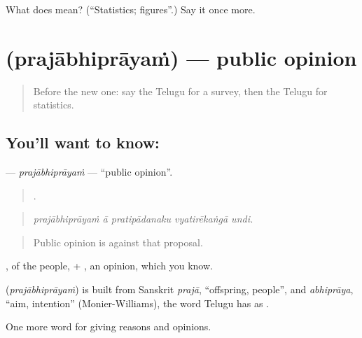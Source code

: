 \begin{tcolorbox}[breakable,colback=teal!4,colframe=teal!35!black,title={Before you move on}]
What does  mean? (\textquotedblleft{}Statistics; figures\textquotedblright{}.) Say it once more.
\end{tcolorbox}
\section[\texorpdfstring{\te{ప్రజాభిప్రాయం} (prajābhiprāyaṁ)}{ప్రజాభిప్రాయం (prajābhiprāyaṁ)}]{ (prajābhiprāyaṁ) — public opinion}

\label{lesson:TE-C411-prajabhiprayam}



\begin{quote}
Before the new one: say the Telugu for a survey, then the Telugu for statistics.
\end{quote}

\subsection*{You'll want to know: }
\textbf{} — \emph{prajābhiprāyaṁ} — \textquotedblleft{}public opinion\textquotedblright{}.

\begin{quote}
    .
\end{quote}

\begin{quote}
\emph{prajābhiprāyaṁ ā pratipādanaku vyatirēkaṅgā undi.}
\end{quote}

\begin{quote}
Public opinion is against that proposal.
\end{quote}

, of the people, + , an opinion, which you know.

\begin{cousinweb}
\textbf{} (\emph{prajābhiprāyaṁ}) is built from Sanskrit \emph{prajā}, \textquotedblleft{}offspring, people\textquotedblright{}, and \emph{abhiprāya}, \textquotedblleft{}aim, intention\textquotedblright{} (Monier-Williams), the word Telugu has as .
\end{cousinweb}

\begin{grammarlens}[title={What you've built}]
One more word for giving reasons and opinions.
\end{grammarlens}

